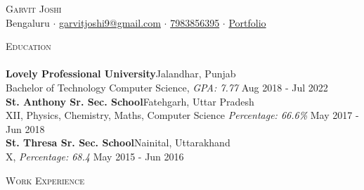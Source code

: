 \documentclass[a4paper]{article}
\newcommand{\lineunder} {
    \vspace*{-8pt} \\
    \hspace*{-18pt} \hrulefill \\
}
\newcommand{\header} [1] {
    {\hspace*{-18pt}\vspace*{6pt} \textsc{#1}}
    \vspace*{-6pt} \lineunder
}
\begin{document}
\vspace*{-40pt}

    

\vspace*{-10pt}
\begin{center}
	{\Huge \scshape {Garvit Joshi}}\\
	Bengaluru $\cdot$ \href{mailto:garvitjoshi9@gmail.com}{garvitjoshi9@gmail.com} $\cdot$ \href{tel:7983856395}{7983856395} $\cdot$ \href{https://garvit-joshi.github.io}{Portfolio}\\
\end{center}

\header{Education}
\textbf{Lovely Professional University}\hfill Jalandhar, Punjab\\
Bachelor of Technology Computer Science, \textit{GPA: 7.77} \hfill Aug 2018 - Jul 2022\\
\vspace{2mm}
\textbf{St. Anthony Sr. Sec. School}\hfill Fatehgarh, Uttar Pradesh\\
XII, Physics, Chemistry, Maths, Computer Science \textit{Percentage: 66.6\%} \hfill May 2017 - Jun 2018\\
\vspace{2mm}
\textbf{St. Thresa Sr. Sec. School}\hfill Nainital, Uttarakhand\\
X, \textit{Percentage: 68.4} \hfill May 2015 - Jun 2016\\
\vspace{2mm}

\header{Work Experience}
\vspace{1mm}
\end{document}
